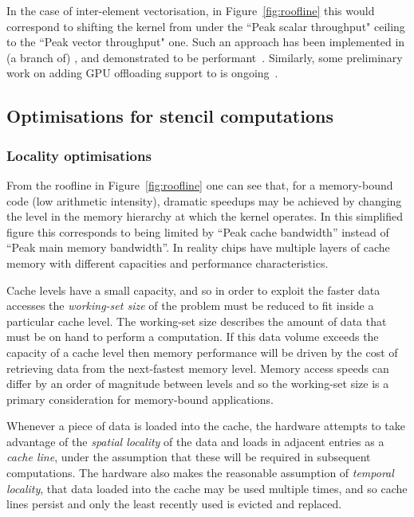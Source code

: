 In the case of inter-element vectorisation, in Figure~\ref{fig:roofline} this would correspond to shifting the kernel from under the ``Peak scalar throughput" ceiling to the ``Peak vector throughput" one.
Such an approach has been implemented in (a branch of) , and demonstrated to be performant~\cite{sunStudyVectorizationMatrixfree2020}.
Similarly, some preliminary work on adding GPU offloading support to  is ongoing~\cite{fenics2021-kulkarni}.

\subsection{Optimisations for stencil computations}
\label{sec:background_opt}

\subsubsection{Locality optimisations}
\label{sec:background_opt_locality}

From the roofline in Figure~\ref{fig:roofline} one can see that, for a memory-bound code (low arithmetic intensity), dramatic speedups may be achieved by changing the level in the memory hierarchy at which the kernel operates.
In this simplified figure this corresponds to being limited by ``Peak cache bandwidth'' instead of ``Peak main memory bandwidth''.
In reality chips have multiple layers of cache memory with different capacities and performance characteristics.

Cache levels have a small capacity, and so in order to exploit the faster data accesses the \textit{working-set size} of the problem must be reduced to fit inside a particular cache level.
The working-set size describes the amount of data that must be on hand to perform a computation.
If this data volume exceeds the capacity of a cache level then memory performance will be driven by the cost of retrieving data from the next-fastest memory level.
Memory access speeds can differ by an order of magnitude between levels and so the working-set size is a primary consideration for memory-bound applications.


Whenever a piece of data is loaded into the cache, the hardware attempts to take advantage of the \textit{spatial locality} of the data and loads in adjacent entries as a \textit{cache line}, under the assumption that these will be required in subsequent computations.
The hardware also makes the reasonable assumption of \textit{temporal locality}, that data loaded into the cache may be used multiple times, and so cache lines persist and only the least recently used is evicted and replaced.

